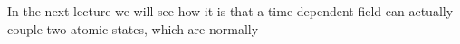 In the next lecture we will see how it is that a time-dependent field can actually couple two atomic states, which are normally 
